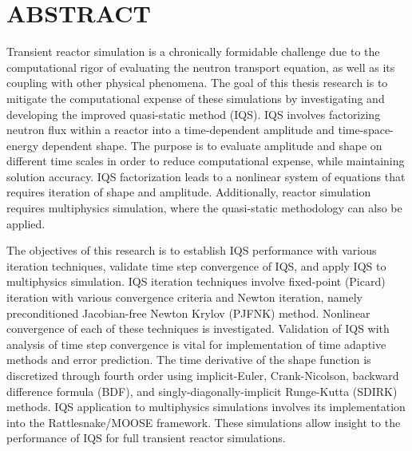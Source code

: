 %
%
%

\chapter*{ABSTRACT}

\pagestyle{plain} %
\setcounter{page}{2}

\indent Transient reactor simulation is a chronically formidable challenge due to the computational rigor of evaluating the neutron transport equation, as well as its coupling with other physical phenomena. The goal of this thesis research is to mitigate the computational expense of these simulations by investigating and developing the improved quasi-static method (IQS). IQS involves factorizing neutron flux within a reactor into a time-dependent amplitude and time-space-energy dependent shape.  The purpose is to evaluate amplitude and shape on different time scales in order to reduce computational expense, while maintaining solution accuracy. IQS factorization leads to a nonlinear system of equations that requires iteration of shape and amplitude. Additionally, reactor simulation requires multiphysics simulation, where the quasi-static methodology can also be applied.

The objectives of this research is to establish IQS performance with various iteration techniques, validate time step convergence of IQS, and apply IQS to multiphysics simulation. IQS iteration techniques involve fixed-point (Picard) iteration with various convergence criteria and Newton iteration, namely preconditioned Jacobian-free Newton Krylov (PJFNK) method. Nonlinear convergence of each of these techniques is investigated. Validation of IQS with analysis of time step convergence is vital for implementation of time adaptive methods and error prediction. The time derivative of the shape function is discretized through fourth order using implicit-Euler, Crank-Nicolson, backward difference formula (BDF), and singly-diagonally-implicit Runge-Kutta (SDIRK) methods. IQS application to multiphysics simulations involves its implementation into the Rattlesnake/MOOSE framework. These simulations allow insight to the performance of IQS for full transient reactor simulations.

